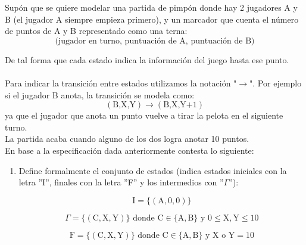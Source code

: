     \begin{exercise}
   
        Supón que se quiere modelar una partida de pimpón donde hay 2 jugadores A y B (el jugador A siempre empieza primero), y un marcador que cuenta el número de puntos de A y B representado como una terna: \[ \text{(jugador en turno, puntuación de A, puntuación de B)} \] 
  
        De tal forma que cada estado indica la información del juego hasta ese punto. \\\\
        Para indicar la transición entre estados utilizamos la notación "$\rightarrow$". Por ejemplo si el jugador B anota, la transición se modela como: \[ (\text{B,X,Y}) \rightarrow (\text{B,X,Y+1}) \]  ya que el jugador que anota un punto vuelve a tirar la pelota en el siguiente turno.\\
        La partida acaba cuando alguno de los dos logra anotar 10 puntos. \\

        En base a la especificación dada anteriormente contesta lo siguiente:
        \begin{enumerate}
            \item Define formalmente el conjunto de estados (indica estados iniciales con la letra  ''I'', finales con la letra  ''F'' y los intermedios con ''$\Gamma$''): 

                \begin{equation}
                    \text{I} = \{(\text{A},0,0)\}\nonumber
                 \end{equation}    

                 \begin{equation}
                    \Gamma = \{(\text{C},\text{X},\text{Y})\} \text{ donde } \text{C} \in \{\text{A},\text{B}\} \text{ y } 0 \leq \text{X},\text{Y} \leq 10\nonumber
                 \end{equation}

                \begin{equation}
                    \text{F} =  \{(\text{C},\text{X},\text{Y})\} \text{ donde } \text{C} \in \{\text{A},\text{B}\} \text{ y X o Y} = 10\nonumber
                \end{equation}


\end{enumerate}
\end{exercise}
